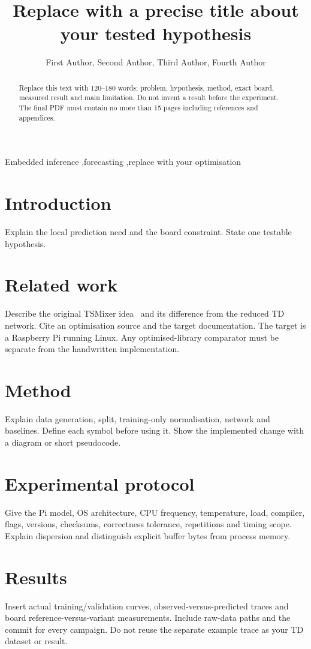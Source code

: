 \documentclass[preprint,11pt,a4paper]{elsarticle}
\begin{document}
\begin{frontmatter}
\title{Replace with a precise title about your tested hypothesis}
\author{First Author, Second Author, Third Author, Fourth Author}
\address{INEM, Group XX, AI for Embedded Systems, 2026--2027}
\begin{abstract}
Replace this text with 120--180 words: problem, hypothesis, method, exact board, measured result and main limitation. Do not invent a result before the experiment. The final PDF must contain no more than 15 pages including references and appendices.
\end{abstract}
\begin{keyword}
Embedded inference \sep forecasting \sep replace with your optimisation
\end{keyword}
\end{frontmatter}
\section{Introduction}
Explain the local prediction need and the board constraint. State one testable hypothesis.
\section{Related work}
Describe the original TSMixer idea~\cite{chen2023tsmixer} and its difference from the reduced TD network. Cite an optimisation source and the target documentation. The target is a Raspberry Pi running Linux. Any optimised-library comparator must be separate from the handwritten implementation.
\section{Method}
Explain data generation, split, training-only normalisation, network and baselines. Define each symbol before using it. Show the implemented change with a diagram or short pseudocode.
\section{Experimental protocol}
Give the Pi model, OS architecture, CPU frequency, temperature, load, compiler, flags, versions, checksums, correctness tolerance, repetitions and timing scope. Explain dispersion and distinguish explicit buffer bytes from process memory.
\section{Results}
Insert actual training/validation curves, observed-versus-predicted traces and board reference-versus-variant measurements. Include raw-data paths and the commit for every campaign. Do not reuse the separate example trace as your TD dataset or result.
\end{document}
